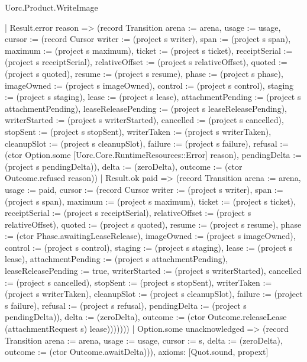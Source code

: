 \begin{lexlean}{Uorc.Product.WriteImage}
\begin{semanticmodule}
{        | Result.error reason => (record Transition {arena := arena, usage := usage, cursor := (record Cursor {writer := (project s writer), span := (project s span), maximum := (project s maximum), ticket := (project s ticket), receiptSerial := (project s receiptSerial), relativeOffset := (project s relativeOffset), quoted := (project s quoted), resume := (project s resume), phase := (project s phase), imageOwned := (project s imageOwned), control := (project s control), staging := (project s staging), lease := (project s lease), attachmentPending := (project s attachmentPending), leaseReleasePending := (project s leaseReleasePending), writerStarted := (project s writerStarted), cancelled := (project s cancelled), stopSent := (project s stopSent), writerTaken := (project s writerTaken), cleanupSlot := (project s cleanupSlot), failure := (project s failure), refusal := (ctor Option.some [Uorc.Core.RuntimeResources::Error] reason), pendingDelta := (project s pendingDelta)}), delta := (zeroDelta), outcome := (ctor Outcome.refused reason)})
        | Result.ok paid => (record Transition {arena := arena, usage := paid, cursor := (record Cursor {writer := (project s writer), span := (project s span), maximum := (project s maximum), ticket := (project s ticket), receiptSerial := (project s receiptSerial), relativeOffset := (project s relativeOffset), quoted := (project s quoted), resume := (project s resume), phase := (ctor Phase.awaitingLeaseRelease), imageOwned := (project s imageOwned), control := (project s control), staging := (project s staging), lease := (project s lease), attachmentPending := (project s attachmentPending), leaseReleasePending := true, writerStarted := (project s writerStarted), cancelled := (project s cancelled), stopSent := (project s stopSent), writerTaken := (project s writerTaken), cleanupSlot := (project s cleanupSlot), failure := (project s failure), refusal := (project s refusal), pendingDelta := (project s pendingDelta)}), delta := (zeroDelta), outcome := (ctor Outcome.releaseLease (attachmentRequest s) lease)}))))))
    | Option.some unacknowledged => (record Transition {arena := arena, usage := usage, cursor := s, delta := (zeroDelta), outcome := (ctor Outcome.awaitDelta)})),
  axioms: [Quot.sound, propext]
}


\end{semanticmodule}
\end{lexlean}
